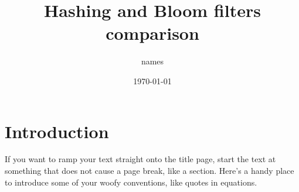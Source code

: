 \documentclass{article}
\title{Hashing and Bloom filters comparison}
\author{names}
\date{\today}
\begin{document}
    \maketitle
    \thispagestyle{empty}
    \begin{abstract}
        \lipsum[1]
    \end{abstract}


    \section*{Introduction}
    If you want to ramp your text straight onto the title page, start the text at
    something that does not cause a page break, like a section.  Here's a handy
    place to introduce some of your woofy conventions, like quotes in equations.
\end{document}
